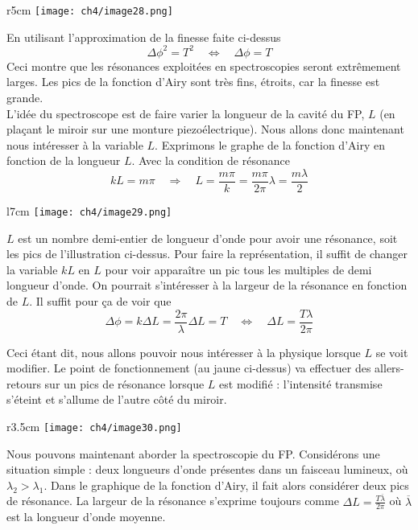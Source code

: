 	\begin{wrapfigure}[8]{r}{5cm}
	\vspace{-8mm}
	\texttt{[image: ch4/image28.png]}
	\end{wrapfigure}
En utilisant l'approximation de la finesse faite ci-dessus
\begin{equation}
\Delta\phi^2 = T^2\quad\Leftrightarrow\quad \Delta\phi = T
\end{equation}
Ceci montre que les résonances exploitées en spectroscopies seront extrêmement larges. Les pics de 
la fonction d'Airy sont très fins, étroits, car la finesse est grande.\\

L'idée du spectroscope est de faire varier la longueur de la cavité du FP, $L$ (en plaçant le miroir 
sur une monture piezoélectrique). Nous allons donc maintenant nous intéresser à la variable $L$. Exprimons 
le graphe de la fonction d'Airy en fonction de la longueur $L$. Avec la condition de résonance 
\begin{equation}
kL = m\pi\quad\Rightarrow\quad L=\frac{m\pi}{k} = \frac{m\pi}{2\pi}\lambda=\frac{m\lambda}{2}
\end{equation}

	\begin{wrapfigure}[9]{l}{7cm}
	\vspace{-8mm}
	\texttt{[image: ch4/image29.png]}
	\end{wrapfigure}
$L$ est un nombre demi-entier de longueur d'onde pour avoir une résonance, soit les pics de l'illustration 
ci-dessus. Pour faire la représentation, il suffit de changer la variable $kL$ en $L$ pour voir 
apparaître un pic tous les multiples de demi longueur d'onde. On pourrait s'intéresser à la largeur de la 
résonance en fonction de $L$. Il suffit pour ça de voir que
\begin{equation}
\Delta\phi = k\Delta L = \frac{2\pi}{\lambda}\Delta L = T\quad\Leftrightarrow\quad \Delta L = \frac{T\lambda}{
2\pi}
\end{equation}


Ceci étant dit, nous allons pouvoir nous intéresser à la physique lorsque $L$ se voit modifier. Le point 
de fonctionnement (au jaune ci-dessus) va effectuer des allers-retours sur un pics de résonance lorsque 
$L$ est modifié : l'intensité transmise s’éteint et s'allume de l'autre côté du miroir.\\

	\begin{wrapfigure}[9]{r}{3.5cm}
	\vspace{-8mm}
	\texttt{[image: ch4/image30.png]}
	\end{wrapfigure}
Nous pouvons maintenant aborder la spectroscopie du FP. Considérons une situation simple : deux longueurs 
d'onde présentes dans un faisceau lumineux, où $\lambda_2>\lambda_1$. Dans le graphique de la fonction 
d'Airy, il fait alors considérer deux pics de résonance. La largeur de la résonance s'exprime toujours 
comme $\Delta L = \frac{T\overline{\lambda}}{2\pi}$ où $\overline{\lambda}$ est la longueur d'onde moyenne.

